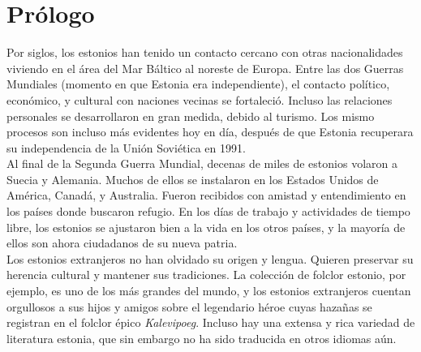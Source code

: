 \chapter*{Prólogo}

Por siglos, los estonios han tenido un contacto cercano con otras nacionalidades viviendo en el área del Mar Báltico al noreste de Europa. Entre las dos Guerras Mundiales (momento en que Estonia era independiente), el contacto político, económico, y cultural con naciones vecinas se fortaleció. Incluso las relaciones personales se desarrollaron en gran medida, debido al turismo. Los mismo procesos son incluso más evidentes hoy en día, después de que Estonia recuperara su independencia de la Unión Soviética en 1991.\\

Al final de la Segunda Guerra Mundial, decenas de miles de estonios volaron a Suecia y Alemania. Muchos de ellos se instalaron en los Estados Unidos de América, Canadá, y Australia. Fueron recibidos con amistad y entendimiento en los países donde buscaron refugio. En los días de trabajo y actividades de tiempo libre, los estonios se ajustaron bien a la vida en los otros países, y la mayoría de ellos son ahora ciudadanos de su nueva patria.\\

Los estonios extranjeros no han olvidado su origen y lengua. Quieren preservar su herencia cultural y mantener sus tradiciones. La colección de folclor estonio, por ejemplo, es uno de los más grandes del mundo, y los estonios extranjeros cuentan orgullosos a sus hijos y amigos sobre el legendario héroe cuyas hazañas se registran en el folclor épico \textit{Kalevipoeg}. Incluso hay una extensa y rica variedad de literatura estonia, que sin embargo no ha sido traducida en otros idiomas aún.

